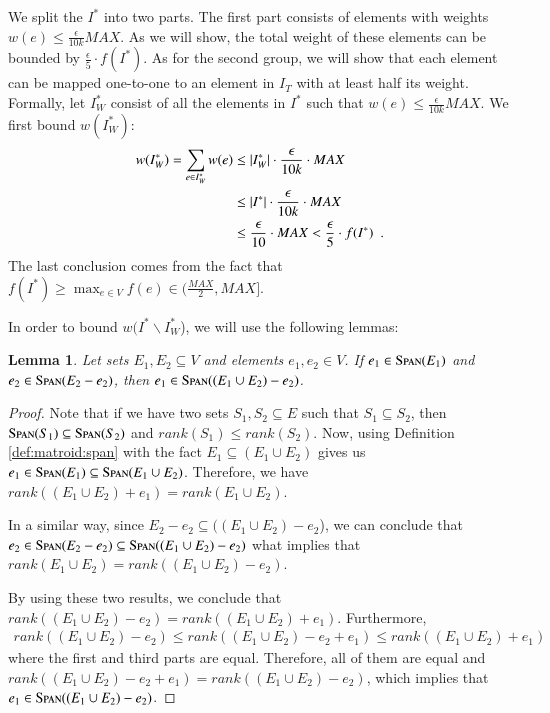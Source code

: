 \documentclass[11pt]{article}
\newtheorem{lemma}[theorem]{Lemma}
\newcommand{\spn}{{\textsc{Span}}}
\begin{document}
We split the $I^*$ into two parts. The first part consists of elements with weights $w(e) \le \frac{\epsilon}{10k}MAX$. As we will show, the total weight of these elements can be bounded by $\frac{\epsilon}{5} \cdot f(I^*)$. As for the second group, we will show that each element can be mapped one-to-one to an element in $I_T$ with at least half its weight. 
~\\
Formally, 
let $I^*_{W}$ consist of all the elements in $I^*$ such that
$w(e) \le \frac{\epsilon}{10k}MAX$. 
We first bound $w(I^*_{W})$:
\begin{align}
    w(I^*_{W})
    =\sum_{e \in I^*_{W}} w(e) 
       \notag
    &\le |I^*_{W}| \cdot \frac{\epsilon}{10k}\cdot MAX
       \notag
    \\&\le |I^*| \cdot \frac{\epsilon}{10k} \cdot MAX
       \notag
   \\& \le \frac{\epsilon}{10} \cdot MAX < \frac{\epsilon}{5} \cdot f(I^*) \enspace .
   \label{eq:jul5_1442}
\end{align}
The last conclusion comes from the fact that $f(I^*) \ge \max_{e \in V} f(e) \in (\frac{MAX}{2}, MAX]$.

In order to bound $w(I^* \backslash I^*_{W}$), we will use the following lemmas:

\begin{lemma}
\label{lm:matroid:e_in_span_span}
     Let sets $E_1, E_2 \subseteq V$ and elements $e_1, e_2 \in V$. If $e_1 \in \spn(E_1)$ and $e_2 \in \spn(E_2 - e_2)$, then $e_1 \in \spn((E_1 \cup E_2) - e_2)$.
\end{lemma}
\begin{proof}
  Note that if we have two sets $S_1, S_2 \subseteq E$ such that $S_1 \subseteq S_2$, then $\spn(S_1) \subseteq \spn(S_2)$ and $rank(S_1) \le rank(S_2)$.  
  Now, using Definition \ref{def:matroid:span} with the fact $E_1 \subseteq (E_1 \cup E_2)$ gives us 
  $      e_1 \in \spn(E_1) \subseteq \spn(E_1 \cup E_2)$. 
  Therefore, we have $rank((E_1 \cup E_2) + e_1) = rank(E_1 \cup E_2)$.

  
  In a similar way, since $E_2-e_2 \subseteq ((E_1 \cup E_2) - e_2$), we can conclude that 
  $e_2 \in \spn(E_2-e_2) \subseteq \spn((E_1 \cup E_2)-e_2)$ 
  what implies that $rank(E_1 \cup E_2) = rank((E_1 \cup E_2) - e_2)$. 
  
  By using these two results, we conclude that $rank((E_1 \cup E_2) - e_2) = rank((E_1 \cup E_2) + e_1)$. Furthermore,
  \begin{align*}
      rank((E_1 \cup E_2) - e_2) \le rank((E_1 \cup E_2) - e_2 + e_1) \le rank((E_1 \cup E_2) + e_1)
  \end{align*}
  where the first and third parts are equal. Therefore, all of them are equal and $rank((E_1 \cup E_2) - e_2 + e_1) = rank((E_1 \cup E_2) - e_2)$, which implies that $e_1 \in \spn((E_1 \cup E_2) - e_2)$.
\end{proof}
\end{document}
